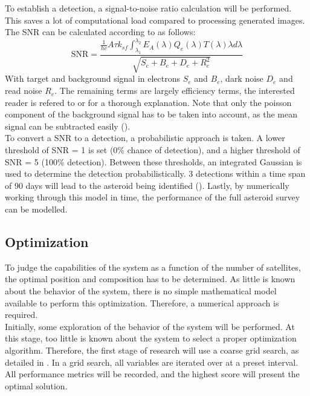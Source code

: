 \documentclass[12pt, english, NoHyper]{AE4010-template}
\begin{document}
To establish a detection, a signal-to-noise ratio calculation will be performed. This saves a lot of computational load compared to processing generated images. The SNR can be calculated according to \cite{NEODetection} as follows:
\begin{equation}
\mathrm{SNR} = \frac{\frac{1}{hc}A\tau k_{sf} \int_{\lambda_1}^{\lambda_2}E_A(\lambda)Q_e(\lambda)T(\lambda)\lambda d \lambda}{\sqrt{S_e + B_e + D_e + R_e^2}}
\end{equation}
With target and background signal in electrons $S_e$ and $B_e$, dark noise $D_e$ and read noise $R_e$. The remaining terms are largely efficiency terms, the interested reader is refered to \cite{NEODetection} or \cite{OpNav} for a thorough explanation. Note that only the poisson component of the background signal has to be taken into account, as the mean signal can be subtracted easily (\cite{OpNav}).\\

To convert a SNR to a detection, a probabilistic approach is taken. A lower threshold of SNR = 1 is set (0\% chance of detection), and a higher threshold of SNR = 5 (100\% detection). Between these thresholds, an integrated Gaussian is used to determine the detection probabilistically. 3 detections within a time span of 90 days will lead to the asteroid being identified (\cite{NEOSDT1}). Lastly, by numerically working through this model in time, the performance of the full asteroid survey can be modelled.

\subsection{Optimization}
To judge the capabilities of the system as a function of the number of satellites, the optimal position and composition has to be determined. As little is known about the behavior of the system, there is no simple mathematical model available to perform this optimization. Therefore, a numerical approach is required. \\

Initially, some exploration of the behavior of the system will be performed. At this stage, too little is known about the system to select a proper optimization algorithm. Therefore, the first stage of research will use a coarse grid search, as detailed in \cite{DLOne}. In a grid search, all variables are iterated over at a preset interval. All performance metrics will be recorded, and the highest score will present the optimal solution. \\
\end{document}
